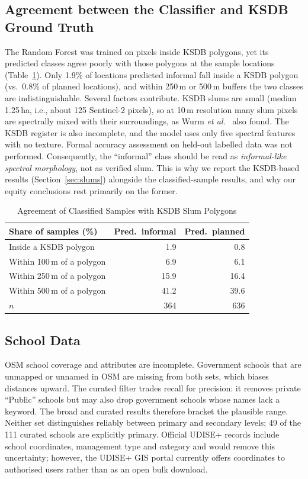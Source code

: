 \documentclass[conference]{IEEEtran}
\newcommand{\m}{\,m}
\begin{document}
\subsection{Agreement between the Classifier and KSDB Ground Truth}
The Random Forest was trained on pixels inside KSDB polygons, yet its predicted classes agree poorly with those polygons at the sample locations (Table~\ref{tab:agree}). Only 1.9\% of locations predicted informal fall inside a KSDB polygon (vs.\ 0.8\% of planned locations), and within 250\m{} or 500\m{} buffers the two classes are indistinguishable. Several factors contribute. KSDB slums are small (median 1.25\,ha, i.e., about 125 Sentinel-2 pixels), so at 10\m{} resolution many slum pixels are spectrally mixed with their surroundings, as Wurm \textit{et al.}\ \cite{wurm2019} also found. The KSDB register is also incomplete, and the model uses only five spectral features with no texture. Formal accuracy assessment on held-out labelled data was not performed. Consequently, the ``informal'' class should be read as \emph{informal-like spectral morphology}, not as verified slum. This is why we report the KSDB-based results (Section~\ref{sec:slums}) alongside the classified-sample results, and why our equity conclusions rest primarily on the former.

\begin{table}[!t]
\centering
\caption{Agreement of Classified Samples with KSDB Slum Polygons}
\label{tab:agree}
\footnotesize
\begin{tabular}{@{}lrr@{}}
\toprule
\textbf{Share of samples (\%)} & \textbf{Pred.\ informal} & \textbf{Pred.\ planned} \\
\midrule
Inside a KSDB polygon & 1.9 & 0.8 \\
Within 100\m{} of a polygon & 6.9 & 6.1 \\
Within 250\m{} of a polygon & 15.9 & 16.4 \\
Within 500\m{} of a polygon & 41.2 & 39.6 \\
\midrule
$n$ & 364 & 636 \\
\bottomrule
\end{tabular}
\end{table}

\subsection{School Data}
OSM school coverage and attributes are incomplete. Government schools that are unmapped or unnamed in OSM are missing from both sets, which biases distances upward. The curated filter trades recall for precision: it removes private ``Public'' schools but may also drop government schools whose names lack a keyword. The broad and curated results therefore bracket the plausible range. Neither set distinguishes reliably between primary and secondary levels; 49 of the 111 curated schools are explicitly primary. Official UDISE+ records include school coordinates, management type and category and would remove this uncertainty; however, the UDISE+ GIS portal currently offers coordinates to authorised users rather than as an open bulk download.
\end{document}
